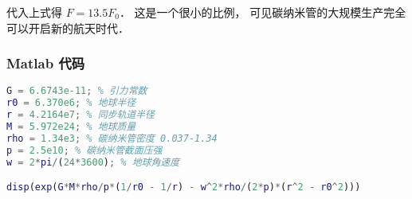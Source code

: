 代入上式得 $F = 13.5 F_0$． 这是一个很小的比例， 可见碳纳米管的大规模生产完全可以开启新的航天时代．

\subsubsection{Matlab 代码}
\begin{lstlisting}[language=matlab]
G = 6.6743e-11; % 引力常数
r0 = 6.370e6; % 地球半径
r = 4.2164e7; % 同步轨道半径
M = 5.972e24; % 地球质量
rho = 1.34e3; % 碳纳米管密度 0.037-1.34
p = 2.5e10; % 碳纳米管截面压强
w = 2*pi/(24*3600); % 地球角速度

disp(exp(G*M*rho/p*(1/r0 - 1/r) - w^2*rho/(2*p)*(r^2 - r0^2)))
\end{lstlisting}
